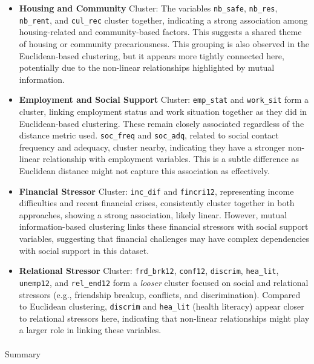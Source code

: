 \documentclass[
]{article}
\makeatletter
\let\oldparagraph\paragraph
\renewcommand{\paragraph}{
    \@ifstar
      \xxxParagraphStar
      \xxxParagraphNoStar
  }
\newcommand{\xxxParagraphStar}[1]{\oldparagraph*{#1}\mbox{}}
\newcommand{\xxxParagraphNoStar}[1]{\oldparagraph{#1}\mbox{}}
\makeatother
\begin{document}
\begin{itemize}
\item
  \textbf{Housing and Community} Cluster: The variables
  \texttt{nb\_safe}, \texttt{nb\_res}, \texttt{nb\_rent}, and
  \texttt{cul\_rec} cluster together, indicating a strong association
  among housing-related and community-based factors. This suggests a
  shared theme of housing or community precariousness. This grouping is
  also observed in the Euclidean-based clustering, but it appears more
  tightly connected here, potentially due to the non-linear
  relationships highlighted by mutual information.
\item
  \textbf{Employment and Social Support} Cluster: \texttt{emp\_stat} and
  \texttt{work\_sit} form a cluster, linking employment status and work
  situation together as they did in Euclidean-based clustering. These
  remain closely associated regardless of the distance metric used.
  \texttt{soc\_freq} and \texttt{soc\_adq}, related to social contact
  frequency and adequacy, cluster nearby, indicating they have a
  stronger non-linear relationship with employment variables. This is a
  subtle difference as Euclidean distance might not capture this
  association as effectively.
\item
  \textbf{Financial Stressor} Cluster: \texttt{inc\_dif} and
  \texttt{fincri12}, representing income difficulties and recent
  financial crises, consistently cluster together in both approaches,
  showing a strong association, likely linear. However, mutual
  information-based clustering links these financial stressors with
  social support variables, suggesting that financial challenges may
  have complex dependencies with social support in this dataset.
\item
  \textbf{Relational Stressor} Cluster: \texttt{frd\_brk12},
  \texttt{conf12}, \texttt{discrim}, \texttt{hea\_lit},
  \texttt{unemp12}, and \texttt{rel\_end12} form a \emph{looser} cluster
  focused on social and relational stressors (e.g., friendship breakup,
  conflicts, and discrimination). Compared to Euclidean clustering,
  \texttt{discrim} and \texttt{hea\_lit} (health literacy) appear closer
  to relational stressors here, indicating that non-linear relationships
  might play a larger role in linking these variables.
\end{itemize}

\paragraph{Summary}\label{summary-2}
\end{document}
